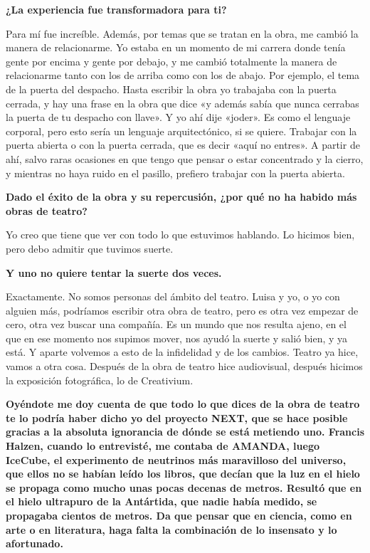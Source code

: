 \documentclass[11pt,a4paper]{article}
\newcommand{\preg}[1]{\textbf{#1}}
\begin{document}
\preg{¿La experiencia fue transformadora para ti?}

Para mí fue increíble. Además, por temas que se tratan en la obra, me cambió la manera de relacionarme. Yo estaba en un momento de mi carrera donde tenía gente por encima y gente por debajo, y me cambió totalmente la manera de relacionarme tanto con los de arriba como con los de abajo. Por ejemplo, el tema de la puerta del despacho. Hasta escribir la obra yo trabajaba con la puerta cerrada, y hay una frase en la obra que dice «y además sabía que nunca cerrabas la puerta de tu despacho con llave». Y yo ahí dije «joder». Es como el lenguaje corporal, pero esto sería un lenguaje arquitectónico, si se quiere. Trabajar con la puerta abierta o con la puerta cerrada, que es decir «aquí no entres». A partir de ahí, salvo raras ocasiones en que tengo que pensar o estar concentrado y la cierro, y mientras no haya ruido en el pasillo, prefiero trabajar con la puerta abierta.

\preg{Dado el éxito de la obra y su repercusión, ¿por qué no ha habido más obras de teatro?}

Yo creo que tiene que ver con todo lo que estuvimos hablando. Lo hicimos bien, pero debo admitir que tuvimos suerte.

\preg{Y uno no quiere tentar la suerte dos veces.}

Exactamente. No somos personas del ámbito del teatro. Luisa y yo, o yo con alguien más, podríamos escribir otra obra de teatro, pero es otra vez empezar de cero, otra vez buscar una compañía. Es un mundo que nos resulta ajeno, en el que en ese momento nos supimos mover, nos ayudó la suerte y salió bien, y ya está. Y aparte volvemos a esto de la infidelidad y de los cambios. Teatro ya hice, vamos a otra cosa. Después de la obra de teatro hice audiovisual, después hicimos la exposición fotográfica, lo de Creativium.

\preg{Oyéndote me doy cuenta de que todo lo que dices de la obra de teatro te lo podría haber dicho yo del proyecto NEXT, que se hace posible gracias a la absoluta ignorancia de dónde se está metiendo uno. Francis Halzen, cuando lo entrevisté, me contaba de AMANDA, luego IceCube, el experimento de neutrinos más maravilloso del universo, que ellos no se habían leído los libros, que decían que la luz en el hielo se propaga como mucho unas pocas decenas de metros. Resultó que en el hielo ultrapuro de la Antártida, que nadie había medido, se propagaba cientos de metros. Da que pensar que en ciencia, como en arte o en literatura, haga falta la combinación de lo insensato y lo afortunado.}
\end{document}

